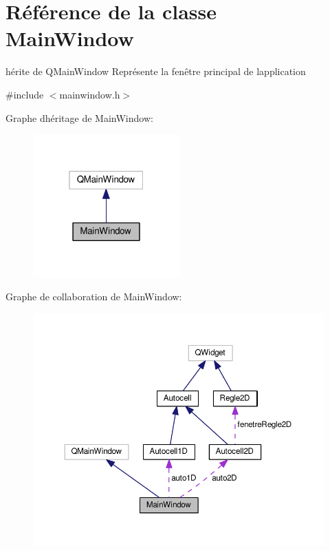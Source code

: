 \hypertarget{class_main_window}{}\section{Référence de la classe Main\+Window}
\label{class_main_window}


hérite de Q\+Main\+Window Représente la fenêtre principal de l\textquotesingle{}application  




{\ttfamily \#include $<$mainwindow.\+h$>$}



Graphe d\textquotesingle{}héritage de Main\+Window\+:\nopagebreak
\begin{figure}[H]
\begin{center}
\leavevmode
\includegraphics[width=160pt]{class_main_window__inherit__graph}
\end{center}
\end{figure}


Graphe de collaboration de Main\+Window\+:\nopagebreak
\begin{figure}[H]
\begin{center}
\leavevmode
\includegraphics[width=350pt]{class_main_window__coll__graph}
\end{center}
\end{figure}
